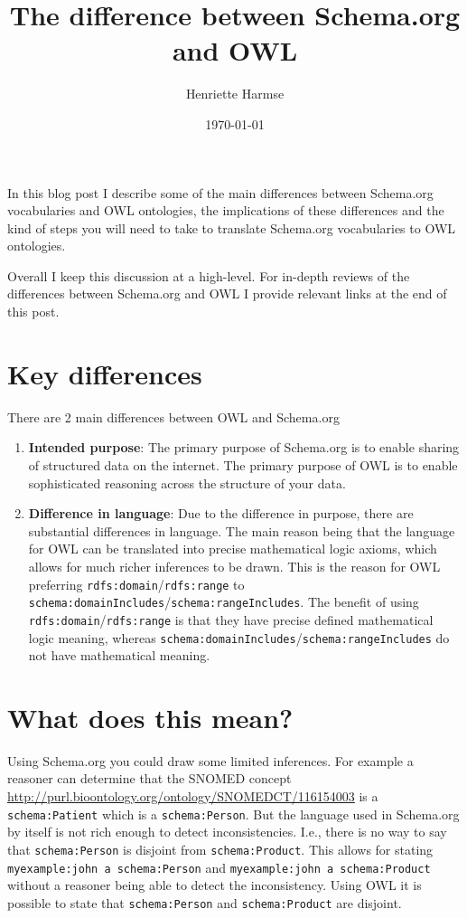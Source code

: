 \documentclass{amsart}
\title{The difference between Schema.org and OWL}
\author{Henriette Harmse}
\date{\today}
\begin{document}
  \maketitle
  
  In this blog post I describe some of the main differences between Schema.org vocabularies and OWL ontologies, the implications of these differences and the kind of steps you will need to take to translate Schema.org vocabularies to OWL ontologies. 
  
  Overall I keep this discussion at a high-level. For in-depth reviews of the differences between Schema.org and OWL I provide relevant links at the end of this post.
  
  \section{Key differences} 
   There are 2 main differences between OWL and Schema.org
   
   \begin{enumerate}
   	\item \textbf{Intended purpose}: The primary purpose of Schema.org is to enable sharing of structured data on the internet. The primary purpose of OWL is to enable sophisticated reasoning across the structure of your data.
   	\item \textbf{Difference in language}: Due to the difference in purpose, there are substantial differences in language. The main reason being that the language for OWL can be translated into precise mathematical logic axioms, which allows for much richer inferences to be drawn. This is the reason for OWL preferring \texttt{rdfs:domain}/\texttt{rdfs:range} to \texttt{schema:domainIncludes}/\texttt{schema:rangeIncludes}. The benefit of using \texttt{rdfs:domain}/\texttt{rdfs:range} is that they have precise defined mathematical logic meaning, whereas \texttt{schema:domainIncludes}/\texttt{schema:rangeIncludes} do not have mathematical meaning.
   \end{enumerate}
   
   \section{What does this mean?}
	Using Schema.org you could draw some limited inferences. For example a reasoner can determine that the SNOMED concept \\ \href{http://purl.bioontology.org/ontology/SNOMEDCT/116154003}{http://purl.bioontology.org/ontology/SNOMEDCT/116154003} is a \texttt{schema:Patient} which is a \texttt{schema:Person}. But the language used in Schema.org by itself is not rich enough to detect inconsistencies. I.e., there is no way to say that \texttt{schema:Person} is disjoint from \texttt{schema:Product}. This allows for stating \texttt{myexample:john a schema:Person} and \texttt{myexample:john a schema:Product} without a reasoner being able to detect the inconsistency. Using OWL it is possible to state that \texttt{schema:Person} and \texttt{schema:Product} are disjoint.
\end{document}
